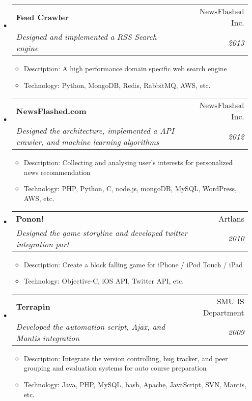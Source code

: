\documentclass[twoside,letterpaper,11pt]{article}
\makeatletter
\newcommand{\resitem}[1]{\item #1 \vspace{-5pt}}
\newcommand{\resheading}[1]{
  \parbox{\textwidth}{
    \begin{shaded}
      \textbf{\sffamily{\mbox{~}{\large #1} \vphantom{p\^{E}}}}
    \end{shaded}
  }\vspace{-6px}
}
\newcommand{\ressubheading}[4]{
\begin{tabular*}{7in}{l@{\extracolsep{\fill}}r}
		\textbf{#1} & #2 \\
		\textit{#3} & \textit{#4} \\
\end{tabular*}\vspace{-6pt}}
\makeatother
\begin{document}
\resheading{Projects}
\begin{itemize}
\item
	\ressubheading{Feed Crawler}{NewsFlashed Inc.}{Designed and implemented a RSS Search engine}{2013}
	\begin{itemize}
		\resitem{Description: A high performance domain specific web search engine}
		\resitem{Technology: Python, MongoDB, Redis, RabbitMQ, AWS, etc.}
	\end{itemize}

\item
	\ressubheading{NewsFlashed.com}{NewsFlashed Inc.}{Designed the architecture, implemented a API crawler, and machine learning algorithms}{2012}
	\begin{itemize}
		\resitem{Description: Collecting and analysing user's interests for personalized news recommendation}
		\resitem{Technology: PHP, Python, C, node.js, mongoDB, MySQL, WordPress, AWS, etc.}
	\end{itemize}


\item
	\ressubheading{Ponon!}{Artlans}{Designed the game storyline and developed twitter integration part}{2010}
	\begin{itemize}
		\resitem{Description: Create a block falling game for iPhone / iPod Touch / iPad}
		\resitem{Technology: Objective-C, iOS API, Twitter API, etc.}
	\end{itemize}

\item 
	\ressubheading{Terrapin}{SMU IS Department}{Developed the automation script, Ajax, and Mantis integration
}{2009}
	\begin{itemize}
		\resitem{Description: Integrate the version controlling, bug tracker, and peer grouping and evaluation systems for auto course preparation}
		\resitem{Technology: Java, PHP, MySQL, bash, Apache, JavaScript, SVN, Mantis, etc.}
	\end{itemize}



\end{itemize}
\end{document}
